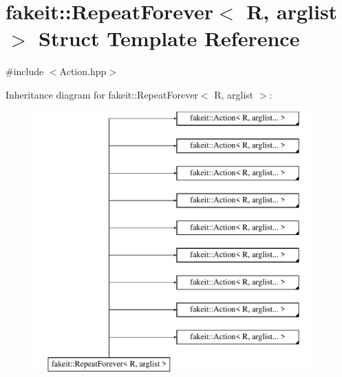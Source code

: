 \hypertarget{structfakeit_1_1RepeatForever}{}\section{fakeit\+::Repeat\+Forever$<$ R, arglist $>$ Struct Template Reference}
\label{structfakeit_1_1RepeatForever}


{\ttfamily \#include $<$Action.\+hpp$>$}

Inheritance diagram for fakeit\+::Repeat\+Forever$<$ R, arglist $>$\+:\begin{figure}[H]
\begin{center}
\leavevmode
\includegraphics[height=10.000000cm]{structfakeit_1_1RepeatForever}
\end{center}
\end{figure}
